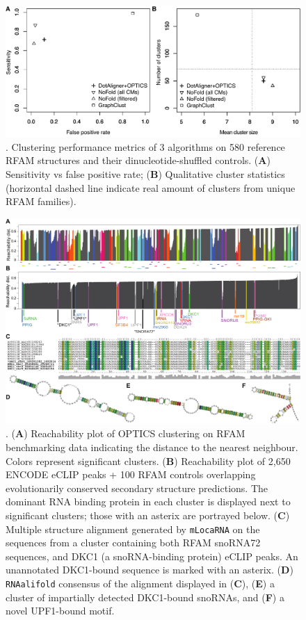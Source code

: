 \documentclass{bmcart}
\begin{document}
\begin{backmatter}
\begin{figure}[h!]
 \includegraphics[width=\textwidth]{fig4}
 \caption {. Clustering performance metrics of 3 algorithms on 580 reference RFAM 
 structures and their dinucleotide-shuffled controls. (\textbf{A}) Sensitivity vs false positive rate; (\textbf{B}) Qualitative cluster statistics (horizontal dashed line indicate real amount of clusters from unique RFAM families). }
\end{figure}


\begin{figure}[h!]
 \includegraphics[width=\textwidth]{fig5}
 \caption {. 
(\textbf{A}) Reachability plot of OPTICS clustering on RFAM benchmarking data indicating the distance to the nearest neighbour. Colors represent 
 significant clusters. 
 (\textbf{B}) Reachability plot of 2,650 ENCODE eCLIP peaks + 100 RFAM controls overlapping evolutionarily conserved secondary structure predictions. The dominant RNA binding protein 
 in each cluster is displayed next to significant clusters; those with an asterix are portrayed below.
 (\textbf{C}) Multiple structure alignment generated by \texttt{mLocaRNA} on the sequences from a 
 cluster containing both RFAM snoRNA72 sequences, and DKC1 (a snoRNA-binding protein) eCLIP peaks. 
An unannotated DKC1-bound sequence is marked with an asterix.
(\textbf{D}) \texttt{RNAalifold} consensus of the alignment displayed in (\textbf{C}), 
(\textbf{E}) a cluster of impartially detected DKC1-bound snoRNAs, 
and (\textbf{F}) a novel UPF1-bound motif. }
\end{figure}



\end{backmatter}
\end{document}
